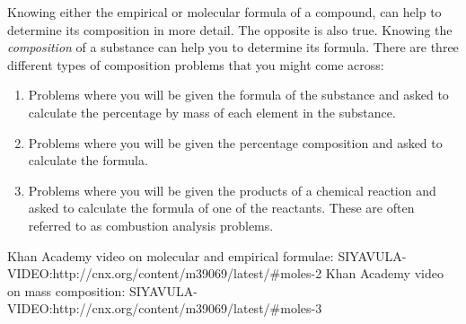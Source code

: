 Knowing either the empirical or molecular formula of a compound, can help to determine its composition in more detail. The opposite is also true. Knowing the \textit{composition} of a substance can help you to determine its formula. There are three different types of composition problems that you might come across:

\begin{enumerate}
\item Problems where you will be given the formula of the substance and asked to calculate the percentage by mass of each element in the substance.
\item Problems where you will be given the percentage composition and asked to calculate the formula.
\item Problems where you will be given the products of a chemical reaction and asked to calculate the formula of one of the reactants. These are often referred to as combustion analysis problems.
\end{enumerate}
Khan Academy video on molecular and empirical formulae: SIYAVULA-VIDEO:http://cnx.org/content/m39069/latest/#moles-2
Khan Academy video on mass composition: SIYAVULA-VIDEO:http://cnx.org/content/m39069/latest/#moles-3
